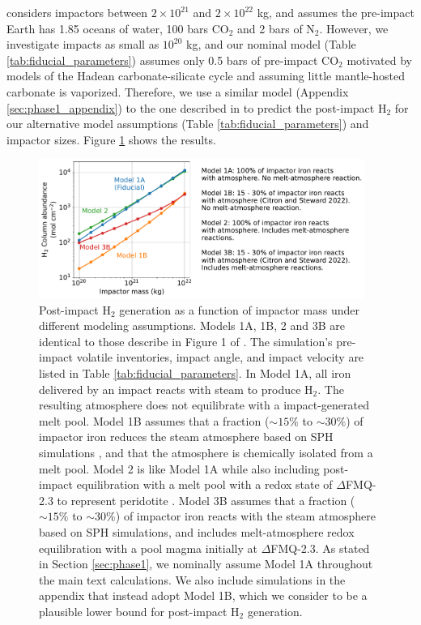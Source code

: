 \citet{Itcovitz_2022} considers impactors between $2 \times 10^{21}$ and $2 \times 10^{22}$ kg, and assumes the pre-impact Earth has 1.85 oceans of water, 100 bars CO$_2$ and 2 bars of N$_2$. However, we investigate impacts as small as $10^{20}$ kg, and our nominal model (Table \ref{tab:fiducial_parameters}) assumes only 0.5 bars of pre-impact CO$_2$ motivated by models of the Hadean carbonate-silicate cycle \citep{Kadoya_2020} and assuming little mantle-hosted carbonate is vaporized. Therefore, we use a similar model (Appendix \ref{sec:phase1_appendix}) to the one described in \citet{Itcovitz_2022} to predict the post-impact H$_2$ for our alternative model assumptions (Table \ref{tab:fiducial_parameters}) and impactor sizes. Figure \ref{fig:melt_reaction_sup} shows the results.

\begin{figure}
  \centering
  \includegraphics[width=0.95\textwidth]{tex/5impacts/figures/melt_reaction_sup.pdf}
  \caption{Post-impact H$_2$ generation as a function of impactor mass under different modeling assumptions. Models 1A, 1B, 2 and 3B are identical to those describe in Figure 1 of \citet{Itcovitz_2022}. The simulation's pre-impact volatile inventories, impact angle, and impact velocity are listed in Table \ref{tab:fiducial_parameters}. In Model 1A, all iron delivered by an impact reacts with steam to produce H$_2$. The resulting atmosphere does not equilibrate with a impact-generated melt pool. Model 1B assumes that a fraction ($\sim 15\%$ to $\sim 30\%$) of impactor iron reduces the steam atmosphere based on SPH simulations \citep{Citron_2022}, and that the atmosphere is chemically isolated from a melt pool. Model 2 is like Model 1A while also including post-impact equilibration with a melt pool with a redox state of $\Delta$FMQ-2.3 to represent peridotite \citep{Itcovitz_2022}. Model 3B assumes that a fraction ($\sim 15\%$ to $\sim 30\%$) of impactor iron reacts with the steam atmosphere based on SPH simulations, and includes melt-atmosphere redox equilibration with a pool magma initially at $\Delta$FMQ-2.3. As stated in Section \ref{sec:phase1}, we nominally assume Model 1A throughout the main text calculations. We also include simulations in the appendix that instead adopt Model 1B, which we consider to be a plausible lower bound for post-impact H$_2$ generation.}
  \label{fig:melt_reaction_sup}
\end{figure}

